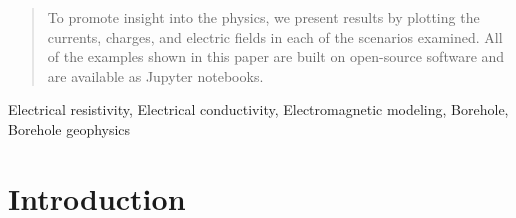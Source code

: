 \documentclass[extra,mreferee]{gji}
\begin{document}
\begin{abstract}
To promote insight into the physics, we present results by plotting the currents, charges, and electric fields in each of the scenarios examined. All of the examples shown in this paper are built on open-source software and are available as Jupyter notebooks.


\end{abstract}

\begin{keywords}
Electrical resistivity, Electrical conductivity, Electromagnetic modeling, Borehole, Borehole geophysics
\end{keywords}


\section{Introduction}
\end{document}
